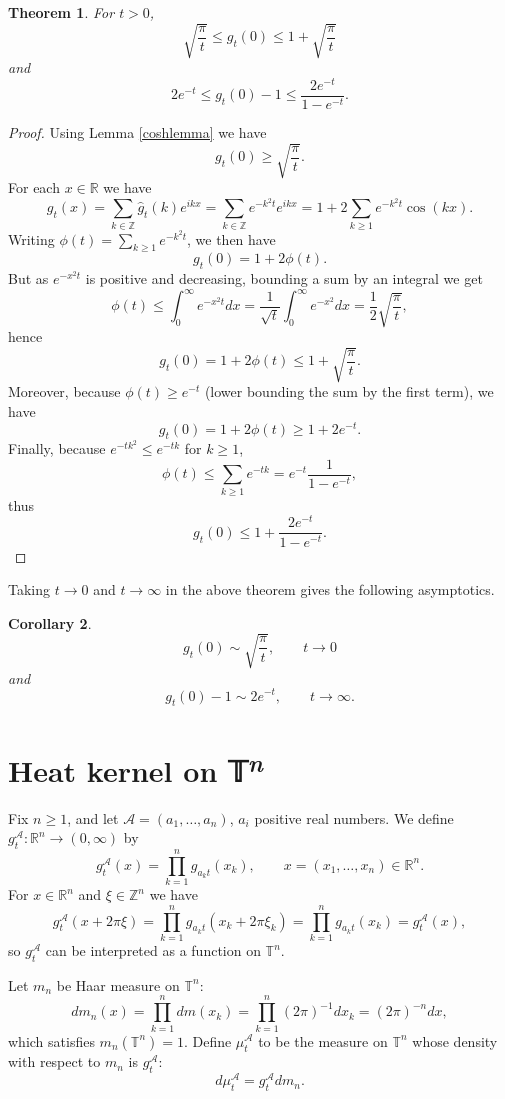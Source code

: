 \documentclass{article}
\newtheorem{theorem}{Theorem}
\newtheorem{corollary}[theorem]{Corollary}
\begin{document}
\begin{theorem}
For $t>0$, 
\[
\sqrt{\frac{\pi}{t}} \leq g_t(0) \leq 1+ \sqrt{\frac{\pi}{t}}
\]
and
\[
2e^{-t} \leq g_t(0) - 1 \leq \frac{2e^{-t}}{1-e^{-t}}.
\]
\label{0inequality}
\end{theorem}
\begin{proof}
Using Lemma \ref{coshlemma} we have
\[
g_t(0) \geq \sqrt{\frac{\pi}{t}}.
\]
For each $x \in \mathbb{R}$ we have
\[
g_t(x)= \sum_{k \in \mathbb{Z}} \hat{g}_t(k) e^{ikx} = \sum_{k \in \mathbb{Z}} e^{-k^2t} e^{ikx} = 
1+2\sum_{k \geq 1} e^{-k^2t} \cos(kx).
\]
Writing $\phi(t)=\sum_{k \geq 1} e^{-k^2t}$, we then have
\[
g_t(0) = 1 + 2\phi(t).
\]
But as $e^{-x^2 t}$ is positive and decreasing, bounding a sum by an integral we get
\[
\phi(t) \leq \int_0^\infty e^{-x^2 t} dx =\frac{1}{\sqrt{t}} \int_0^\infty e^{-x^2} dx = \frac{1}{2} \sqrt{\frac{\pi}{t}},
\]
hence
\[
g_t(0)=1+2\phi(t) \leq 1 + \sqrt{\frac{\pi}{t}}.
\]
Moreover, because $\phi(t) \geq e^{-t}$ (lower bounding the sum by the first term), we have
\[
g_t(0) =1+2\phi(t) \geq 1+2e^{-t}.
\]
Finally, because $e^{-tk^2} \leq e^{-tk}$ for $k \geq 1$,
\[
\phi(t) \leq \sum_{k \geq 1} e^{-tk} = e^{-t} \frac{1}{1-e^{-t}},
\]
thus
\[
g_t(0) \leq 1 + \frac{2e^{-t}}{1-e^{-t}}.
\]
\end{proof}

Taking $t \to 0$ and $t \to \infty$ in the above theorem gives the following asymptotics.

\begin{corollary}
\[
g_t(0) \sim \sqrt{\frac{\pi}{t}}, \qquad t \to 0
\]
and
\[
g_t(0) -1 \sim 2e^{-t}, \qquad t \to \infty.
\]
\end{corollary}


\section{Heat kernel on 𝕋\textsuperscript{{\em n}}}
Fix $n \geq 1$, and let $\mathscr{A}=(a_1,\ldots,a_n)$, $a_i$ positive real numbers. We define
$g_t^\mathscr{A}:\mathbb{R}^n \to (0,\infty)$ by 
\[
g_t^\mathscr{A}(x) = \prod_{k=1}^n g_{a_k t}(x_k), \qquad x =(x_1,\ldots,x_n) \in \mathbb{R}^n.
\]
For $x \in \mathbb{R}^n$ and $\xi \in \mathbb{Z}^n$ we have
\[
g_t^\mathscr{A}(x+2\pi \xi)= \prod_{k=1}^n g_{a_k t}(x_k+2\pi \xi_k)
=\prod_{k=1}^n g_{a_k t}(x_k)=
 g_t^\mathscr{A}(x),
\]
so $g_t^\mathscr{A}$ can be interpreted as a function on $\mathbb{T}^n$.

Let $m_n$ be Haar measure on $\mathbb{T}^n$:
\[
dm_n(x) = \prod_{k=1}^n dm(x_k) = \prod_{k=1}^n (2\pi)^{-1} dx_k = (2\pi)^{-n} dx,
\] 
which satisfies $m_n(\mathbb{T}^n)=1$.
Define $\mu_t^\mathscr{A}$ to be the measure on $\mathbb{T}^n$ whose density with respect to $m_n$
is $g_t^\mathscr{A}$:
\[
d\mu_t^{\mathscr{A}} = g_t^{\mathscr{A}} dm_n.
\]
\end{document}
